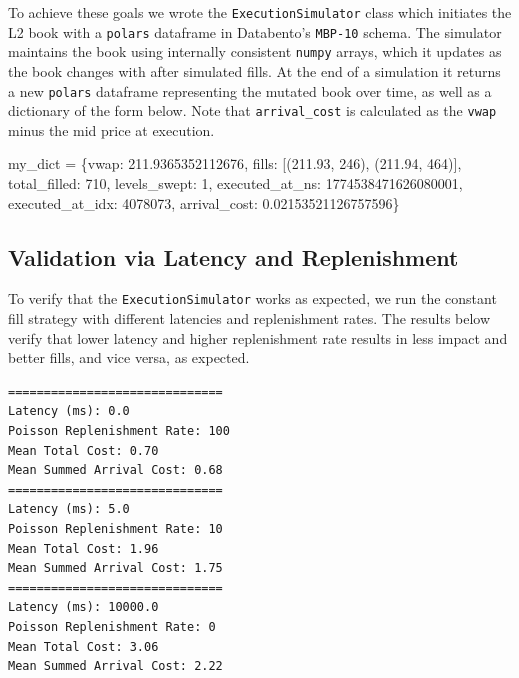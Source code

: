 \documentclass[
  letterpaper,
]{article}
\newenvironment{Shaded}{\begin{snugshade}}{\end{snugshade}}
\newcommand{\DecValTok}[1]{\textcolor[rgb]{0.68,0.00,0.00}{#1}}
\newcommand{\FloatTok}[1]{\textcolor[rgb]{0.68,0.00,0.00}{#1}}
\newcommand{\NormalTok}[1]{\textcolor[rgb]{0.00,0.23,0.31}{#1}}
\newcommand{\OperatorTok}[1]{\textcolor[rgb]{0.37,0.37,0.37}{#1}}
\newcommand{\StringTok}[1]{\textcolor[rgb]{0.13,0.47,0.30}{#1}}
\begin{document}
To achieve these goals we wrote the \texttt{ExecutionSimulator} class
which initiates the L2 book with a \texttt{polars} dataframe in
Databento's \texttt{MBP-10} schema. The simulator maintains the book
using internally consistent \texttt{numpy} arrays, which it updates as
the book changes with after simulated fills. At the end of a simulation
it returns a new \texttt{polars} dataframe representing the mutated book
over time, as well as a dictionary of the form below. Note that
\texttt{arrival\_cost} is calculated as the \texttt{vwap} minus the mid
price at execution.

\begin{Shaded}
\begin{Highlighting}[]
\NormalTok{my\_dict }\OperatorTok{=}\NormalTok{ \{}\StringTok{\textquotesingle{}vwap\textquotesingle{}}\NormalTok{: }\FloatTok{211.9365352112676}\NormalTok{,}
 \StringTok{\textquotesingle{}fills\textquotesingle{}}\NormalTok{: [(}\FloatTok{211.93}\NormalTok{, }\DecValTok{246}\NormalTok{), (}\FloatTok{211.94}\NormalTok{, }\DecValTok{464}\NormalTok{)],}
 \StringTok{\textquotesingle{}total\_filled\textquotesingle{}}\NormalTok{: }\DecValTok{710}\NormalTok{,}
 \StringTok{\textquotesingle{}levels\_swept\textquotesingle{}}\NormalTok{: }\DecValTok{1}\NormalTok{,}
 \StringTok{\textquotesingle{}executed\_at\_ns\textquotesingle{}}\NormalTok{: }\DecValTok{1774538471626080001}\NormalTok{,}
 \StringTok{\textquotesingle{}executed\_at\_idx\textquotesingle{}}\NormalTok{: }\DecValTok{4078073}\NormalTok{,}
 \StringTok{\textquotesingle{}arrival\_cost\textquotesingle{}}\NormalTok{: }\FloatTok{0.02153521126757596}\NormalTok{\}}
\end{Highlighting}
\end{Shaded}

\subsection{Validation via Latency and
Replenishment}\label{validation-via-latency-and-replenishment}

To verify that the \texttt{ExecutionSimulator} works as expected, we run
the constant fill strategy with different latencies and replenishment
rates. The results below verify that lower latency and higher
replenishment rate results in less impact and better fills, and vice
versa, as expected.

\begin{verbatim}
==============================
Latency (ms): 0.0
Poisson Replenishment Rate: 100
Mean Total Cost: 0.70
Mean Summed Arrival Cost: 0.68
==============================
Latency (ms): 5.0
Poisson Replenishment Rate: 10
Mean Total Cost: 1.96
Mean Summed Arrival Cost: 1.75
==============================
Latency (ms): 10000.0
Poisson Replenishment Rate: 0
Mean Total Cost: 3.06
Mean Summed Arrival Cost: 2.22
\end{verbatim}
\end{document}
